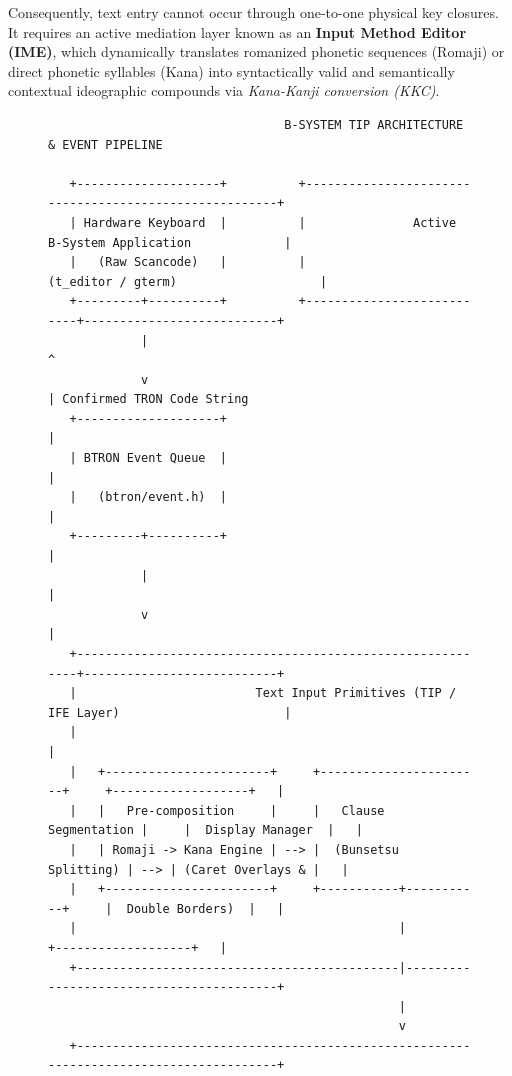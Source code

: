 \documentclass[10pt,journal,compsoc,twocolumn]{article}
\begin{document}
Consequently, text entry cannot occur through one-to-one physical key closures. It requires an active mediation layer known as an \textbf{Input Method Editor (IME)}, which dynamically translates romanized phonetic sequences (Romaji) or direct phonetic syllables (Kana) into syntactically valid and semantically contextual ideographic compounds via \emph{Kana-Kanji conversion (KKC)}.

\begin{figure}[htbp]
\centering
\begin{lstlisting}
                                 B-SYSTEM TIP ARCHITECTURE & EVENT PIPELINE
                                 
   +--------------------+          +-------------------------------------------------------+
   | Hardware Keyboard  |          |               Active B-System Application             |
   |   (Raw Scancode)   |          |                 (t_editor / gterm)                    |
   +---------+----------+          +---------------------------+---------------------------+
             |                                                 ^
             v                                                 | Confirmed TRON Code String
   +--------------------+                                      |
   | BTRON Event Queue  |                                      |
   |   (btron/event.h)  |                                      |
   +---------+----------+                                      |
             |                                                 |
             v                                                 |
   +-----------------------------------------------------------+---------------------------+
   |                         Text Input Primitives (TIP / IFE Layer)                       |
   |                                                                                       |
   |   +-----------------------+     +-----------------------+     +-------------------+   |
   |   |   Pre-composition     |     |   Clause Segmentation |     |  Display Manager  |   |
   |   | Romaji -> Kana Engine | --> |  (Bunsetsu Splitting) | --> | (Caret Overlays & |   |
   |   +-----------------------+     +-----------+-----------+     |  Double Borders)  |   |
   |                                             |                 +-------------------+   |
   +---------------------------------------------|-----------------------------------------+
                                                 |
                                                 v
   +---------------------------------------------------------------------------------------+

\end{lstlisting}
\end{figure}
\end{document}

